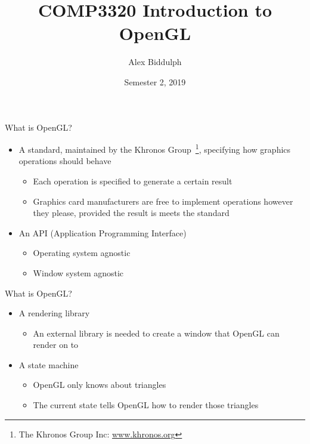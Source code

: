\documentclass{beamer}
\title{COMP3320 Introduction to OpenGL}
\author{Alex Biddulph}
\institute{
    The University of Newcastle, Australia
    \and
    Based on the work provided at \url{www.learnopengl.com}
}
\date{Semester 2, 2019}
\begin{document}
\begin{frame}
\titlepage
\end{frame}

\begin{frame}{What is OpenGL?}
    \begin{itemize}
        \item A standard, maintained by the Khronos Group~\footnote{The Khronos Group Inc: \url{www.khronos.org}},
            specifying how graphics operations should behave
        \begin{itemize}
            \item Each operation is specified to generate a certain result
            \item Graphics card manufacturers are free to implement operations however they please, provided the result
                is meets the standard
        \end{itemize}
        \item An API (Application Programming Interface)
        \begin{itemize}
            \item Operating system agnostic
            \item Window system agnostic
        \end{itemize}
    \end{itemize}
\end{frame}

\begin{frame}{What is OpenGL?}
    \begin{itemize}
        \item A rendering library
        \begin{itemize}
            \item An external library is needed to create a window that OpenGL can render on to
        \end{itemize}
        \item A state machine
        \begin{itemize}
            \item OpenGL only knows about triangles
            \item The current state tells OpenGL how to render those triangles
        \end{itemize}
    \end{itemize}
\end{frame}
\end{document}

